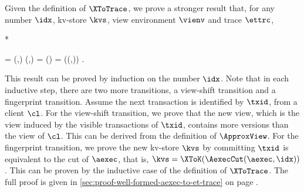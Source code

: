 \begin{proofsketch}
Given the definition of \( \XToTrace \), we prove a stronger result that,
for any number \( \idx \), kv-store \( \kvs \), view environment \( \vienv \) and trace \( \ettrc \),
\begin{Formulae}*
\begin{Formula}
\ettrc = \XToTraceN(\aexec,\idx) \land (\kvs,\vienv) = \LastConf(\ettrc) 
        \land \kvs = \XToK(\AexecCut(\aexec,\idx)) .
\end{Formula}
\end{Formulae}
This result can be proved by induction on the number \( \idx \).
Note that in each inductive step,
there are two more transitions, a view-shift transition and a fingerprint transition.
Assume the next transaction is identified by \( \txid \), from a client \( \cl \).
For the view-shift transition, we prove that the new view,
which is the view induced by the visible transactions of \( \txid \),
contains more versions than the view of \( \cl \).
This can be derived from the definition of \( \ApproxView \).
For the fingerprint transition,
we prove the new kv-store \( \kvs \) by committing \( \txid \) 
is equivalent to the \Th{\idx} cut of \( \aexec \), 
that is,   \( \kvs = \XToK(\AexecCut(\aexec,\idx)) \).
This can be proven by the inductive case of the definition of  \( \XToTrace \).
The full proof is given in \cref{sec:proof-well-formed-aexec-to-et-trace} 
on page \pageref{sec:proof-well-formed-aexec-to-et-trace}.
\end{proofsketch}
